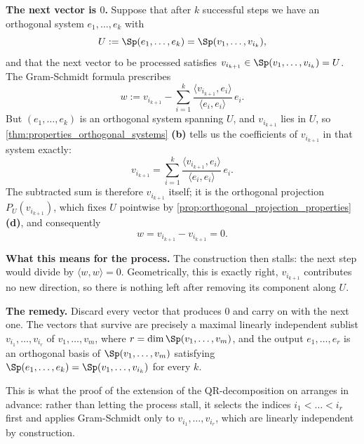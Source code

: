 \begin{exercisesolution*}
\label{sol:gram_schmidt_dependent}
  \textbf{The next vector is $0$.} Suppose that after $k$ successful steps we have an orthogonal system $e_1, \dots, e_k$ with
  \[ U := \Sp(e_1, \dots, e_k) = \Sp(v_1, \dots, v_{i_k}), \]
  and that the next vector to be processed satisfies $v_{i_{k+1}} \in \Sp(v_1, \dots, v_{i_k}) = U$. The Gram-Schmidt formula prescribes
  \[ w := v_{i_{k+1}} - \sum_{i=1}^{k} \frac{\langle v_{i_{k+1}}, e_i \rangle}{\langle e_i, e_i \rangle} \, e_i . \]
  But $(e_1, \dots, e_k)$ is an orthogonal system spanning $U$, and $v_{i_{k+1}}$ lies in $U$, so \cref{thm:properties_orthogonal_systems} \textbf{(b)} tells us the coefficients of $v_{i_{k+1}}$ in that system exactly:
  \[ v_{i_{k+1}} = \sum_{i=1}^{k} \frac{\langle v_{i_{k+1}}, e_i \rangle}{\langle e_i, e_i \rangle} \, e_i . \]
  The subtracted sum is therefore $v_{i_{k+1}}$ itself; it is the orthogonal projection $P_U(v_{i_{k+1}})$, which fixes $U$ pointwise by \cref{prop:orthogonal_projection_properties} \textbf{(d)}, and consequently
  \[ w = v_{i_{k+1}} - v_{i_{k+1}} = 0 . \]

  \textbf{What this means for the process.} The construction then stalls: the next step would divide by $\langle w, w \rangle = 0$. Geometrically, this is exactly right, $v_{i_{k+1}}$ contributes no new direction, so there is nothing left after removing its component along $U$.

  \textbf{The remedy.} Discard every vector that produces $0$ and carry on with the next one. The vectors that survive are precisely a maximal linearly independent sublist $v_{i_1}, \dots, v_{i_r}$ of $v_1, \dots, v_m$, where $r = \dim \Sp(v_1, \dots, v_m)$, and the output $e_1, \dots, e_r$ is an orthogonal basis of $\Sp(v_1, \dots, v_m)$ satisfying $\Sp(e_1, \dots, e_k) = \Sp(v_1, \dots, v_{i_k})$ for every $k$.

  This is what the proof of the extension of the QR-decomposition on  arranges in advance: rather than letting the process stall, it selects the indices $i_1 < \dots < i_r$ first and applies Gram-Schmidt only to $v_{i_1}, \dots, v_{i_r}$, which are linearly independent by construction.
\end{exercisesolution*}



